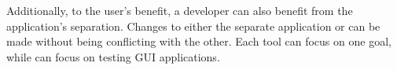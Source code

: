 Additionally, to the user's benefit, a \testar developer can also benefit from the application's separation. Changes to either the separate application or \testar can be made without being conflicting with the other. Each tool can focus on one goal, while \testar can focus on testing GUI applications. 

% 
% 
% 
% 

